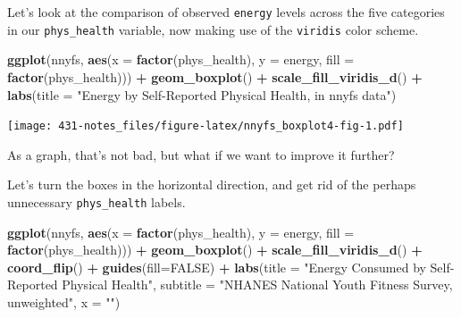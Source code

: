 \documentclass[
]{book}
\newenvironment{Shaded}{\begin{snugshade}}{\end{snugshade}}
\newcommand{\DataTypeTok}[1]{\textcolor[rgb]{0.13,0.29,0.53}{#1}}
\newcommand{\KeywordTok}[1]{\textcolor[rgb]{0.13,0.29,0.53}{\textbf{#1}}}
\newcommand{\NormalTok}[1]{#1}
\newcommand{\OperatorTok}[1]{\textcolor[rgb]{0.81,0.36,0.00}{\textbf{#1}}}
\newcommand{\OtherTok}[1]{\textcolor[rgb]{0.56,0.35,0.01}{#1}}
\newcommand{\StringTok}[1]{\textcolor[rgb]{0.31,0.60,0.02}{#1}}
\begin{document}
Let's look at the comparison of observed \texttt{energy} levels across the five categories in our \texttt{phys\_health} variable, now making use of the \texttt{viridis} color scheme.

\begin{Shaded}
\begin{Highlighting}[]
\KeywordTok{ggplot}\NormalTok{(nnyfs, }\KeywordTok{aes}\NormalTok{(}\DataTypeTok{x =} \KeywordTok{factor}\NormalTok{(phys_health), }\DataTypeTok{y =}\NormalTok{ energy, }\DataTypeTok{fill =} \KeywordTok{factor}\NormalTok{(phys_health))) }\OperatorTok{+}
\StringTok{  }\KeywordTok{geom_boxplot}\NormalTok{() }\OperatorTok{+}\StringTok{ }
\StringTok{  }\KeywordTok{scale_fill_viridis_d}\NormalTok{() }\OperatorTok{+}\StringTok{ }
\StringTok{  }\KeywordTok{labs}\NormalTok{(}\DataTypeTok{title =} \StringTok{"Energy by Self-Reported Physical Health, in nnyfs data"}\NormalTok{)}
\end{Highlighting}
\end{Shaded}

\texttt{[image: 431-notes\_files/figure-latex/nnyfs\_boxplot4-fig-1.pdf]}

As a graph, that's not bad, but what if we want to improve it further?

Let's turn the boxes in the horizontal direction, and get rid of the perhaps unnecessary \texttt{phys\_health} labels.

\begin{Shaded}
\begin{Highlighting}[]
\KeywordTok{ggplot}\NormalTok{(nnyfs, }\KeywordTok{aes}\NormalTok{(}\DataTypeTok{x =} \KeywordTok{factor}\NormalTok{(phys_health), }\DataTypeTok{y =}\NormalTok{ energy, }\DataTypeTok{fill =} \KeywordTok{factor}\NormalTok{(phys_health))) }\OperatorTok{+}
\StringTok{    }\KeywordTok{geom_boxplot}\NormalTok{() }\OperatorTok{+}\StringTok{ }
\StringTok{    }\KeywordTok{scale_fill_viridis_d}\NormalTok{() }\OperatorTok{+}\StringTok{ }
\StringTok{    }\KeywordTok{coord_flip}\NormalTok{() }\OperatorTok{+}\StringTok{ }
\StringTok{    }\KeywordTok{guides}\NormalTok{(}\DataTypeTok{fill=}\OtherTok{FALSE}\NormalTok{) }\OperatorTok{+}
\StringTok{    }\KeywordTok{labs}\NormalTok{(}\DataTypeTok{title =} \StringTok{"Energy Consumed by Self-Reported Physical Health"}\NormalTok{, }
         \DataTypeTok{subtitle =} \StringTok{"NHANES National Youth Fitness Survey, unweighted"}\NormalTok{, }
         \DataTypeTok{x =} \StringTok{""}\NormalTok{)}
\end{Highlighting}
\end{Shaded}
\end{document}
